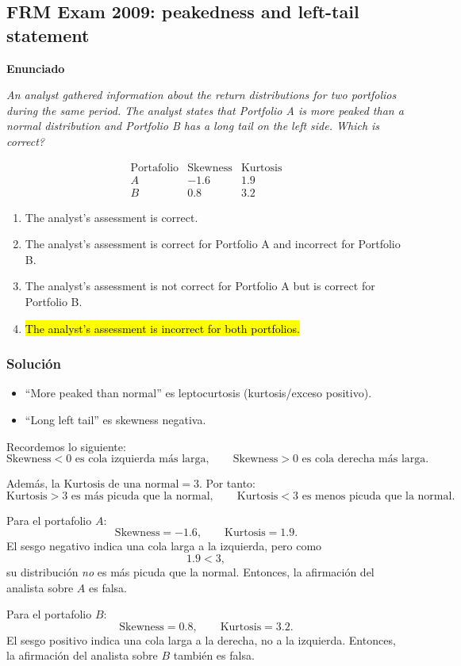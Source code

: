 ﻿\subsection{FRM Exam 2009: peakedness and left-tail statement}

\textbf{Enunciado}

\emph{An analyst gathered information about the return distributions for two portfolios during the same period.
The analyst states that Portfolio A is more peaked than a normal distribution and Portfolio B has a long tail on the left side. Which is correct?}


\[
\begin{array}{c|cc}
\text{Portafolio} & \text{Skewness} & \text{Kurtosis} \\
\hline
A & -1.6 & 1.9 \\
B & 0.8 & 3.2
\end{array}
\]


\begin{enumerate}[label=\alph*.]
\item The analyst’s assessment is correct.
\item The analyst’s assessment is correct for Portfolio A and incorrect for Portfolio B.
\item The analyst’s assessment is not correct for Portfolio A but is correct for Portfolio B.
\item \hl{The analyst’s assessment is incorrect for both portfolios.}
\end{enumerate}

\subsubsection*{Solución}

\begin{itemize}
\item ``More peaked than normal'' es leptocurtosis (kurtosis/exceso positivo).
\item ``Long left tail'' es skewness negativa.
\end{itemize}

\vspace{1cm}
Recordemos lo siguiente:
\[
\text{Skewness}<0 \text{ es cola izquierda más larga},
\qquad
\text{Skewness}>0 \text{ es cola derecha más larga}.
\]

Además, la \(\text{Kurtosis de una normal}=3.\) Por tanto:
\[
\text{Kurtosis}>3 \text{ es más picuda que la normal},
\qquad
\text{Kurtosis}<3 \text{ es menos picuda que la normal}.
\]

Para el portafolio \(A\):
\[
\text{Skewness}=-1.6,\qquad \text{Kurtosis}=1.9.
\]
El sesgo negativo indica una cola larga a la izquierda, pero como
\[
1.9<3,
\]
su distribución \emph{no} es más picuda que la normal. Entonces, la afirmación
del analista sobre \(A\) es falsa.

Para el portafolio \(B\):
\[
\text{Skewness}=0.8,\qquad \text{Kurtosis}=3.2.
\]
El sesgo positivo indica una cola larga a la derecha, no a la izquierda.
Entonces, la afirmación del analista sobre \(B\) también es falsa.




